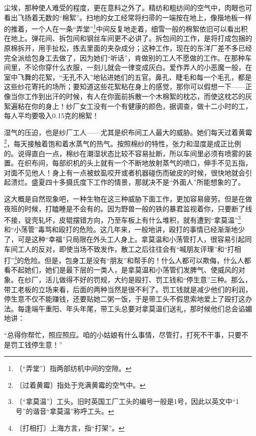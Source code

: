 \documentclass[12pt,UTF-8,openany]{ctexbook}
\begin{document}
\begin{normalsize}
    尘埃，那种使人难受的程度，更在意料之外了。精纺和粗纺间的空气中，肉眼也可看出飞扬着无数的“棉絮”。扫地的女工经常将扫帚的一端按在地上，像揩地板一样的推着，一个人在一条“弄堂”\footnote{〔“弄堂”〕指两部纺机中间的空隙。}中间反复地走着，细雪一般的棉絮依旧可以看出积在地上。弹花间、拆包间和钢丝车间更不必讲了。拆包间的工作，是将打成包捆的原棉拆开，用手扯松，拣去里面的夹杂成分；这种工作，现在的东洋厂差不多已经完全派给包身工去做了，因为她们“听话”，肯做别的工人不愿做的工作。在那种车间里，不论你穿什么衣服，一刻儿就会一律变成灰白。爱作弄人的小恶魔一般，在室中飞舞的花絮，“无孔不入”地钻进她们的五官。鼻孔、睫毛和每一个毛孔，都是这些纱花寄托的场所；要知道这些花絮粘在身上的感觉，那你可以假想一下——正像当你工作到出汗的时候，有人在你面前拆散一个木棉絮的枕芯，而使这枕芯的灰絮遍粘在你的身上！纱厂女工没有一个有健康的颜色，据调查，做十二小时的工，每人平均要吸入0.15克的棉絮！
    
    湿气的压迫，也是纱厂工人——尤其是织布间工人最大的威胁。她们每天过着黄霉\footnote{〔过着黄霉〕指处于充满黄霉的空气中。}，每天接触着饱和着水蒸气的热气。按照棉纱的特性，张力和湿度是成正比例的。说得直白一点，棉纱在潮湿状态比较不容易扯断，所以车间里必须有喷雾的装置。在织布间，每部织机的头上就有一个不断地放射蒸气的喷口，伸手不见五指，对面不见他人！身上有一点被蚊虱咬开或者机器碰伤而破皮的时候，很快地就会引起溃烂。盛夏四十多摄氏度下工作的情景，那就决不是“外面人”所能想象的了。
    
    这大概是自然现象吧，一种生物在这三种威胁下面工作，更加容易疲劳。但是在做夜班的时候，打瞌睡是不会有的。因为野兽一般的铁的暴君监视着你，只要断了线不接，锭壳轧坏，皮辊摆错方向，乃至车板上有什么堆积，就有遭到“拿莫温”\footnote{〔“拿莫温”〕工头。旧时英国工厂工头的编号一般是1号，因此以英文中“1号”的谐音“拿莫温”称呼工头。}和“小荡管”毒骂和殴打的危险。这几年来，一般地讲，殴打的事情已经渐渐地少了，可是这种“幸福”只局限在外头工人身上。拿莫温和小荡管打人，很容易引起同车间工人的反对，即使当场不致发作，散工之后往往会有“喊朋友评理”和“打相打”\footnote{〔打相打〕上海方言，指“打架”。}的危险。但是，包身工是没有“朋友”和帮手的！什么人都可以欺侮，什么人都看不起她们，她们是最下层的一类人，是拿莫温和小荡管们发脾气、使威风的对象。在纱厂，活儿做得不好的罚规，大约是殴打、罚工钱和“停生意”三种。那么，带工老板的立场来看，后面的两种当然是很不利了。罚工钱就是减少他们的利润，停生意不仅不能赚钱，还要贴她二粥一饭，于是带工头不假思索地爱上了殴打这办法。每逢端午重阳、年头年尾，带工头总要对拿莫温们送礼，那时候他们总会谄媚地讲：
    
    “总得你帮忙，照应照应。咱的小姑娘有什么事情，尽管打，打死不干事，只要不是罚工钱停生意！”
    

\end{normalsize}
\end{document}
